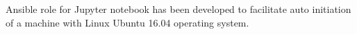 Ansible role for Jupyter notebook has been developed to facilitate auto initiation of a machine with Linux Ubuntu 16.04 operating system. 